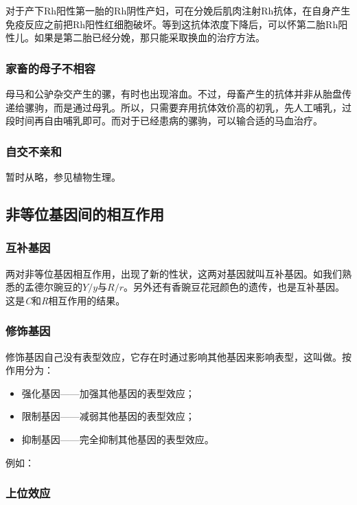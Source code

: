 对于产下Rh阳性第一胎的Rh阴性产妇，可在分娩后肌肉注射Rh抗体，在自身产生免疫反应之前把Rh阳性红细胞破坏。等到这抗体浓度下降后，可以怀第二胎Rh阳性儿。如果是第二胎已经分娩，那只能采取换血的治疗方法。

\subsubsection{家畜的母子不相容}

母马和公驴杂交产生的骡，有时也出现溶血。不过，母畜产生的抗体并非从胎盘传递给骡驹，而是通过母乳。所以，只需要弃用抗体效价高的初乳，先人工哺乳，过段时间再自由哺乳即可。而对于已经患病的骡驹，可以输合适的马血治疗。

\subsubsection{自交不亲和}

暂时从略，参见植物生理。

\subsection{非等位基因间的相互作用}

\subsubsection{互补基因}

两对非等位基因相互作用，出现了新的性状，这两对基因就叫互补基因。如我们熟悉的孟德尔豌豆的$Y/y$与$R/r$。另外还有香豌豆花冠颜色的遗传，也是互补基因。这是\textit{C}和\textit{R}相互作用的结果。

\subsubsection{修饰基因}

修饰基因自己没有表型效应，它存在时通过影响其他基因来影响表型，这叫做。按作用分为：
\begin{itemize}
	\item 强化基因——加强其他基因的表型效应；
	\item 限制基因——减弱其他基因的表型效应；
	\item 抑制基因——完全抑制其他基因的表型效应。
\end{itemize}

例如：

\subsubsection{上位效应}

